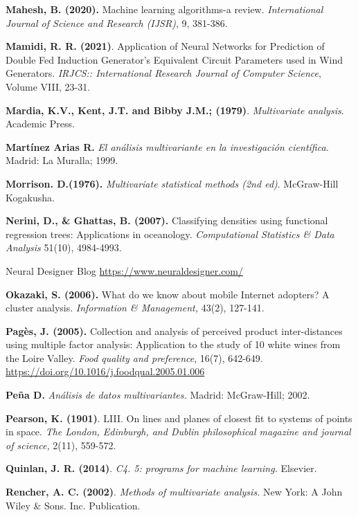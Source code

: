 \begin{thebibliography}{99}
\textbf{Mahesh, B. (2020).} Machine learning algorithms-a review. \emph{International Journal of Science and Research (IJSR)}, 9, 381-386.

\textbf{Mamidi, R. R. (2021)}. Application of Neural Networks for Prediction of Double Fed Induction Generator’s Equivalent Circuit Parameters used in Wind Generators. \emph{IRJCS:: International Research Journal of Computer Science}, Volume VIII, 23-31.

\textbf{Mardia, K.V., Kent, J.T. and Bibby J.M.; (1979)}. \emph{Multivariate analysis}. Academic Press.

\textbf{Martínez Arias R.} \emph{El análisis multivariante en la investigación científica.} Madrid: La Muralla; 1999. 

\textbf{Morrison. D.(1976).}\textit{ Multivariate statistical methods (2nd ed)}. McGraw-Hill Kogakusha.

\textbf{Nerini, D., \& Ghattas, B. (2007).} Classifying densities using functional regression trees: Applications in oceanology. \emph{Computational Statistics \& Data Analysis} 51(10), 4984-4993.

 Neural Designer Blog \url{https://www.neuraldesigner.com/}

\textbf{Okazaki, S. (2006).} What do we know about mobile Internet adopters? A cluster analysis. \emph{Information \& Management,} 43(2), 127-141.

\textbf{Pagès, J. (2005).} Collection and analysis of perceived product inter-distances using multiple factor analysis: Application to the study of 10 white wines from the Loire Valley. \emph{Food quality and preference}, 16(7), 642-649.  \url{https://doi.org/10.1016/j.foodqual.2005.01.006
}

\textbf{Peña D.} \emph{Análisis de datos multivariantes.} Madrid: McGraw-Hill; 2002.

 \textbf{Pearson, K. (1901)}. LIII. On lines and planes of closest fit to systems of points in space. \emph{The London, Edinburgh, and Dublin philosophical magazine and journal of science,} 2(11), 559-572.

\textbf{Quinlan, J. R. (2014)}. \emph{C4. 5: programs for machine learning.} Elsevier.

 \textbf{Rencher, A. C. (2002)}. \emph{Methods of multivariate analysis.} New York: A John Wiley \& Sons. Inc. Publication.


\end{thebibliography}
